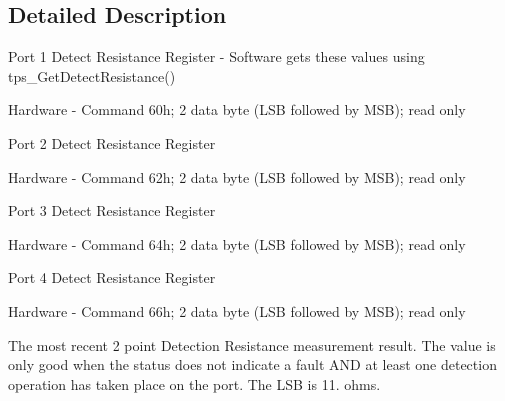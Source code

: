 \subsection{Detailed Description}
Port 1 Detect Resistance Register -\/ Software gets these values using tps\-\_\-\-Get\-Detect\-Resistance() \par
 Hardware -\/ Command 60h; 2 data byte (L\-S\-B followed by M\-S\-B); read only \par
 Port 2 Detect Resistance Register \par
 Hardware -\/ Command 62h; 2 data byte (L\-S\-B followed by M\-S\-B); read only \par
 Port 3 Detect Resistance Register \par
 Hardware -\/ Command 64h; 2 data byte (L\-S\-B followed by M\-S\-B); read only \par
 Port 4 Detect Resistance Register \par
 Hardware -\/ Command 66h; 2 data byte (L\-S\-B followed by M\-S\-B); read only \par
\par
 The most recent 2 point Detection Resistance measurement result. The value is only good when the status does not indicate a fault A\-N\-D at least one detection operation has taken place on the port. The L\-S\-B is 11. ohms. 


